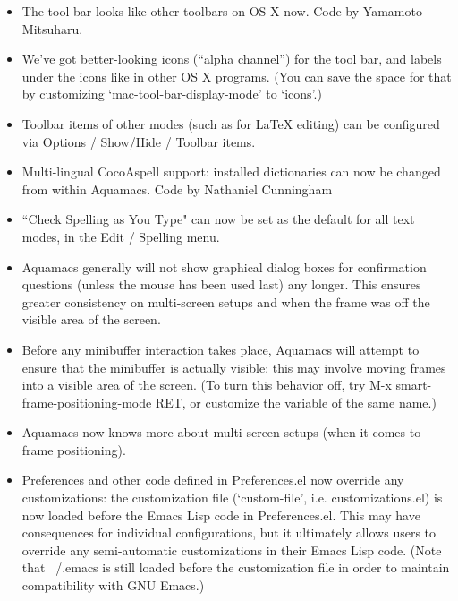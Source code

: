 \begin{itemize}
\item The tool bar looks like other toolbars on OS X now. Code by Yamamoto Mitsuharu.

\item We've got better-looking icons (``alpha channel'') for the tool bar, and labels under the icons like in other OS X programs. (You can save the space for that by customizing `mac-tool-bar-display-mode' to `icons'.)

\item Toolbar items of other modes (such as for LaTeX editing) can be configured via Options / Show/Hide / Toolbar items.

\item Multi-lingual CocoAspell support: installed dictionaries can now be changed from within Aquamacs.
Code by Nathaniel Cunningham

\item ``Check Spelling as You Type" can now be set as the default for all text modes, in the Edit / Spelling menu.

\item Aquamacs generally will not show graphical dialog boxes for confirmation questions (unless the mouse has been used last) any longer.  This ensures greater consistency on multi-screen setups and when the frame was off the visible area of the screen.

\item Before any minibuffer interaction takes place, Aquamacs will attempt to ensure that the minibuffer is actually visible: this may involve moving frames into a visible area of the screen.  (To turn this behavior off, try M-x smart-frame-positioning-mode RET, or customize the variable of the same name.)

\item Aquamacs now knows more about multi-screen setups (when it comes to frame positioning).

\item Preferences and other code defined in Preferences.el now override any customizations: the customization file (`custom-file', i.e. customizations.el) is now loaded before the Emacs Lisp code in Preferences.el.  This may have consequences for individual configurations, but it ultimately allows users to override any semi-automatic customizations in their Emacs Lisp code. (Note that ~/.emacs is still loaded before the customization file in order to maintain compatibility with GNU Emacs.)



\end{itemize}
